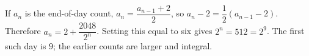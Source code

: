 If $a_n$ is the end-of-day count, $a_n=\dfrac{a_{n-1}+2}{2}$, so $a_n-2=\dfrac{1}{2}(a_{n-1}-2)$. Therefore $a_n=2+\dfrac{2048}{2^n}$. Setting this equal to six gives $2^n=512=2^9$. The first such day is $\boxed9$; the earlier counts are larger and integral.
